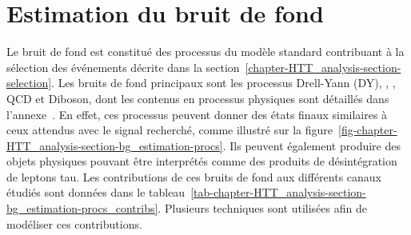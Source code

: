 \section{Estimation du bruit de fond}\label{chapter-HTT_analysis-section-bg_estimation}
Le bruit de fond est constitué des processus du modèle standard contribuant à la sélection des événements décrite dans la section~\ref{chapter-HTT_analysis-section-selection}.
Les bruits de fond principaux sont les processus Drell-Yann (DY), \ttbar, \Wjets, QCD et Diboson, dont les contenus en processus physiques sont détaillés dans l'annexe~.
En effet, ces processus peuvent donner des états finaux similaires à ceux attendus avec le signal recherché, comme illustré sur la figure~\ref{fig-chapter-HTT_analysis-section-bg_estimation-procs}.
Ils peuvent également produire des objets physiques pouvant être interprétés comme des produits de désintégration de leptons tau.
Les contributions de ces bruits de fond aux différents canaux étudiés sont données dans le tableau~\ref{tab-chapter-HTT_analysis-section-bg_estimation-procs_contribs}.
Plusieurs techniques sont utilisées afin de modéliser ces contributions.
